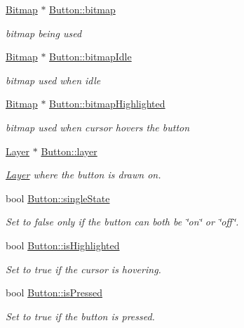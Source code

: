 \begin{DoxyCompactItemize}
\mbox{\hyperlink{struct_bitmap}{Bitmap}} $\ast$ \mbox{\hyperlink{group__sprite_gaa57f73b6227397e025dc60e8c460fcb3}{Button\+::bitmap}}
\begin{DoxyCompactList}\small\item\em bitmap being used \end{DoxyCompactList}\item 
\mbox{\hyperlink{struct_bitmap}{Bitmap}} $\ast$ \mbox{\hyperlink{group__sprite_ga509d33b7b3b9dd4f7c10c3c05c0a6ca0}{Button\+::bitmap\+Idle}}
\begin{DoxyCompactList}\small\item\em bitmap used when idle \end{DoxyCompactList}\item 
\mbox{\hyperlink{struct_bitmap}{Bitmap}} $\ast$ \mbox{\hyperlink{group__sprite_gaf915bef19af626f44f41a7513feaef7e}{Button\+::bitmap\+Highlighted}}
\begin{DoxyCompactList}\small\item\em bitmap used when cursor hovers the button \end{DoxyCompactList}\item 
\mbox{\hyperlink{struct_layer}{Layer}} $\ast$ \mbox{\hyperlink{group__sprite_ga76e365a5ffde4b0759c8bbd1cc7b932c}{Button\+::layer}}
\begin{DoxyCompactList}\small\item\em \mbox{\hyperlink{struct_layer}{Layer}} where the button is drawn on. \end{DoxyCompactList}\item 
bool \mbox{\hyperlink{group__sprite_ga582e96a8182496689178c543a86d3401}{Button\+::single\+State}}
\begin{DoxyCompactList}\small\item\em Set to false only if the button can both be \char`\"{}on\char`\"{} or \char`\"{}off\char`\"{}. \end{DoxyCompactList}\item 
bool \mbox{\hyperlink{group__sprite_ga0d0eccfb33156acc548e70e09bfbf69b}{Button\+::is\+Highlighted}}
\begin{DoxyCompactList}\small\item\em Set to true if the cursor is hovering. \end{DoxyCompactList}\item 
bool \mbox{\hyperlink{group__sprite_gaf40951436602ca874e5a7bc90774a71b}{Button\+::is\+Pressed}}
\begin{DoxyCompactList}\small\item\em Set to true if the button is pressed. \end{DoxyCompactList}\item 

\end{DoxyCompactItemize}
